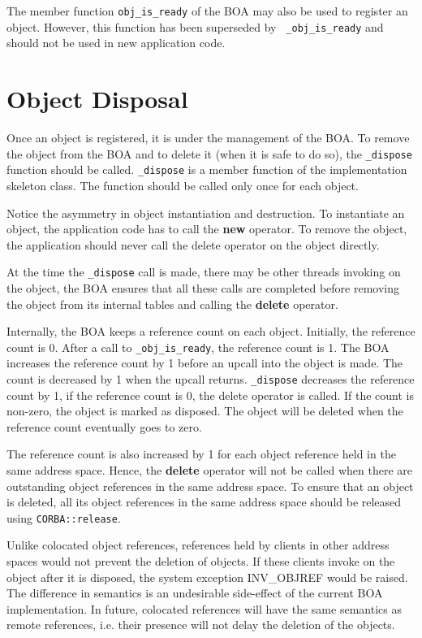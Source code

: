 \documentclass[11pt,twoside,onecolumn]{book}
\begin{document}
The member function {\tt obj\_is\_ready} of the BOA may also be used to
register an object. However, this function has been superseded by {\tt
\_obj\_is\_ready} and should not be used in new application code.

\section{Object Disposal}

Once an object is registered, it is under the
management of the BOA. To remove the object from the BOA and to delete it
(when it is safe to do so), the {\tt \_dispose} function should be called.
{\tt \_dispose} is a member function of the implementation skeleton class.
The function should be called only once for each object.

Notice the asymmetry in object instantiation and destruction. To instantiate
an object, the application code has to call the {\bf new}
operator. To remove the object, the application should never
call the delete operator on the object directly.

At the time the {\tt \_dispose} call is made, there may be other threads
invoking on the object, the BOA ensures that all these calls are completed
before removing the object from its internal tables and calling the
{\bf delete} operator.

Internally, the BOA keeps a reference count on each object. Initially, the
reference count is 0. After a call to {\tt \_obj\_is\_ready}, the reference
count is 1. The BOA increases the reference count by 1 before
an upcall into the object is made. The count is decreased by 1 when the
upcall returns.  {\tt \_dispose} decreases the reference count by 1, if
the reference count is 0, the delete operator is called. If the count is
non-zero, the object is marked as disposed. The object will be deleted when
the reference count eventually goes to zero.

The reference count is also increased by 1 for each object reference held
in the same address space. Hence, the {\bf delete} operator will not be
called when there are outstanding object references in the same address
space. To ensure that an object is deleted, all its object references in
the same address space should be released using {\tt CORBA::release}.

Unlike colocated object references, references held by clients in other
address spaces would not prevent the deletion of objects. If these clients
invoke on the object after it is disposed, the system exception INV\_OBJREF
would be raised. The difference in semantics is an undesirable side-effect
of the current BOA implementation. In future, colocated references will
have the same semantics as remote references, i.e. their presence will not
delay the deletion of the objects.
\end{document}
